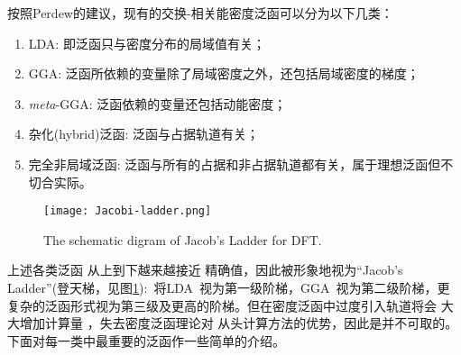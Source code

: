 按照Perdew的建议\cite{Perdew-Schmidt_2001}，现有的交换-相关能密度泛函可以分为以下几类：
\begin{enumerate}
  \item LDA: 即泛函只与密度分布的局域值有关；
  \item GGA: 泛函所依赖的变量除了局域密度之外，还包括局域密度的梯度；
  \item \textit{meta}-GGA: 泛函依赖的变量还包括动能密度；
  \item {杂化(hybrid)泛函}: 泛函与占据轨道有关；
  \item 完全非局域泛函: 泛函与所有的占据和非占据轨道都有关，属于理想泛函但不%
{切合实际}。
\end{enumerate}
\begin{figure}[!h]
\centering
\texttt{[image: Jacobi-ladder.png]}
\caption{\small The schematic digram of Jacob's Ladder for DFT.\cite{Perdew-Schmidt_2001,Science298-759_2002}}
\label{Fig:Jacob-Ladder}
\end{figure}

上述{各类}泛函%
从上到下越来越接近%
精确值，因此被形象地视为``Jacob's Ladder''(登天梯，见图\ref{Fig:Jacob-Ladder}):~将\textrm{LDA~}视为第一级阶梯，\textrm{GGA~}视为第二级阶梯，更复杂的泛函形式视为第三级及更高的阶梯。\cite{PRL91-146401_2003}但在密度泛函中过度引入轨道将会%
{大大增加}计算量%
，失去密度泛函理论对%
从头计算方法的优势，因此是{并}不可取的。
下面对每一类中最重要的泛函作一些简单的介绍。

